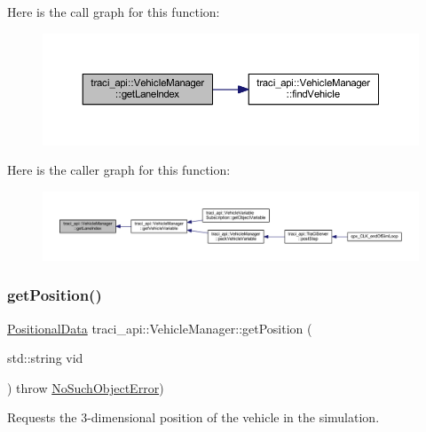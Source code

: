 Here is the call graph for this function\+:\nopagebreak
\begin{figure}[H]
\begin{center}
\leavevmode
\includegraphics[width=350pt]{classtraci__api_1_1_vehicle_manager_a8daaf314dfb440dfb48575b072cd0d41_cgraph}
\end{center}
\end{figure}
Here is the caller graph for this function\+:\nopagebreak
\begin{figure}[H]
\begin{center}
\leavevmode
\includegraphics[width=350pt]{classtraci__api_1_1_vehicle_manager_a8daaf314dfb440dfb48575b072cd0d41_icgraph}
\end{center}
\end{figure}
\mbox{\label{classtraci__api_1_1_vehicle_manager_ad00a8d49736c7806f0d363d641b7f467}} 
\subsubsection{\texorpdfstring{get\+Position()}{getPosition()}}
{\footnotesize\ttfamily \hyperlink{class_positional_data}{Positional\+Data} traci\+\_\+api\+::\+Vehicle\+Manager\+::get\+Position (\begin{DoxyParamCaption}\item[{std\+::string}]{vid }\end{DoxyParamCaption}) throw  \hyperlink{classtraci__api_1_1_no_such_object_error}{No\+Such\+Object\+Error}) }



Requests the 3-\/dimensional position of the vehicle in the simulation. 


